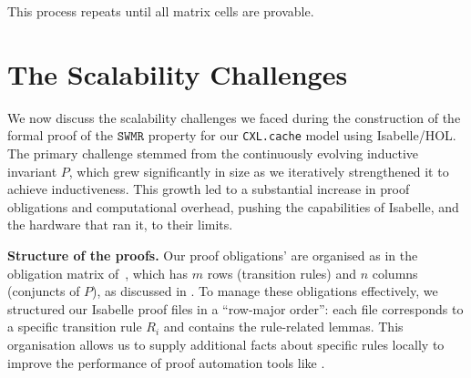 \documentclass[10pt,conference]{IEEEtran}
\newcommand\CXLcache{\texttt{CXL.cache}}
\newcommand{\StateSymbol}{\Sigma}
\newcommand{\makestep}[2]{%
  \xrightarrow[%
    {\mathclap{\scriptscriptstyle
      \ifstrempty{#2}{}{#2}
    }}%
  ]{%
    {\mathclap{\scriptscriptstyle
      \ifstrempty{#1}{}{#1}
    }}%
  }%
}
\newcommand\SWMR{\texttt{SWMR}}
\newcommand\field[1]{\textsf{#1}}
\newcommand\devcachei[1]{\field{Cachelines(Dev)}_{#1}}
\newcommand\State{\field{State}}
\newcommand\Modified{\STATE{M}}
\newcommand\Shared{\STATE{S}}
\newcommand\STATE[1]{\textsf{#1}}
\begin{document}
This process repeats until all matrix cells are provable. 


\section{The Scalability Challenges}
\label{sec:challenges}
We now discuss the scalability challenges we faced during the construction of the formal proof of the $\SWMR$ property for our \CXLcache{} model using Isabelle/HOL. The primary challenge stemmed from the continuously evolving inductive invariant $P$, which grew significantly in size as we iteratively strengthened it to achieve inductiveness. This growth led to a substantial increase in proof obligations and computational overhead, pushing the capabilities of Isabelle, and the hardware that ran it, to their limits.

\smallskip
\noindent
\textbf{Structure of the proofs.}
Our proof obligations' are organised as in the obligation matrix of~, which has $m$ rows (transition rules) and $n$ columns (conjuncts of $P$), as discussed in . To manage these obligations effectively, we structured our Isabelle proof files in a ``row-major order'': each file corresponds to a specific transition rule $R_i$ and contains the rule-related lemmas. This organisation allows us to supply additional facts about specific rules locally to improve the performance of proof automation tools like \sledgehammer{}.
\end{document}
